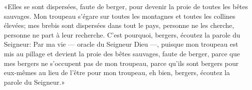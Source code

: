 «Elles se sont dispersées, faute de berger,
	pour devenir la proie de toutes les bêtes sauvages.
Mon troupeau s’égare sur toutes les montagnes et toutes les collines élevées;
	mes brebis sont dispersées dans tout le pays,
	personne ne les cherche, personne ne part à leur recherche.
C’est pourquoi, bergers, écoutez la parole du Seigneur:
	Par ma vie --- oracle du Seigneur Dieu ---,
	puisque mon troupeau est mis au pillage et devient la proie des bêtes sauvages,
	faute de berger, parce que mes bergers ne s’occupent pas de mon troupeau,
	parce qu’ils sont bergers pour eux-mêmes au lieu de l’être pour mon troupeau,
	eh bien, bergers, écoutez la parole du Seigneur.»
